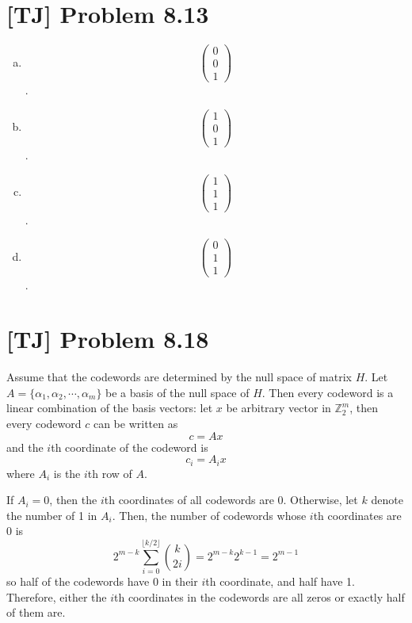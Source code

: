\documentclass[a4paper,11pt,twocolumn]{article}
\begin{document}
  \section{[TJ] Problem 8.13}
  \begin{enumerate}[(a)]
    \item $$ \begin{pmatrix} 0 \\ 0 \\ 1 \end{pmatrix} $$.
    \item $$ \begin{pmatrix} 1 \\ 0 \\ 1 \end{pmatrix} $$.
    \item $$ \begin{pmatrix} 1 \\ 1 \\ 1 \end{pmatrix} $$.
    \item $$ \begin{pmatrix} 0 \\ 1 \\ 1 \end{pmatrix} $$.
  \end{enumerate}
  
  \section{[TJ] Problem 8.18}
  Assume that the codewords are determined by the null space of matrix $H$. Let $A = \{\alpha_1, \alpha_2, \cdots, \alpha_m\}$ be a basis of the null space of $H$. Then every codeword is a linear combination of the basis vectors: let $x$ be arbitrary vector in $\mathbb{Z}_2^{m}$, then every codeword $c$ can be written as
  $$ c = Ax $$
  and the $i$th coordinate of the codeword is
  $$ c_i = A_i x$$
  where $A_i$ is the $i$th row of $A$. \par
  If $A_i = 0$, then the $i$th coordinates of all codewords are 0. Otherwise, let $k$ denote the number of 1 in $A_i$. Then, the number of codewords whose $i$th coordinates are 0 is
  $$ 2^{m-k} \sum_{i = 0}^{\lfloor k/2 \rfloor} \binom{k}{2i} = 2^{m-k}2^{k-1} = 2^{m-1} $$
  so half of the codewords have 0 in their $i$th coordinate, and half have 1. Therefore, either the $i$th coordinates in the codewords are all zeros or exactly half of them are.
\end{document}
